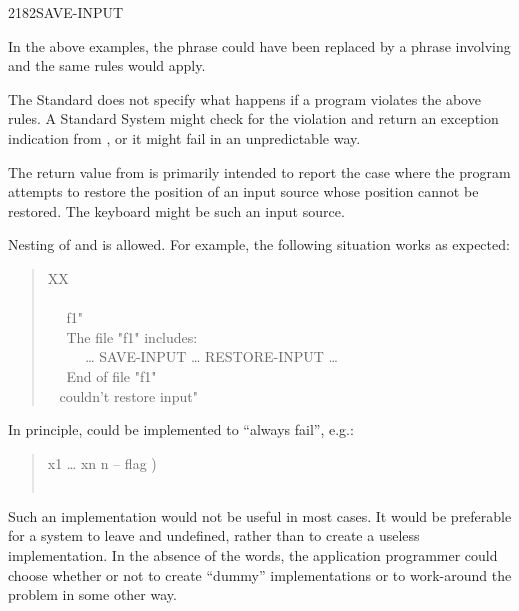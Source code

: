 \begin{newword}{2182}{SAVE-INPUT}
\begin{rationale}
		In the above examples, the  phrase could have
		been replaced by a phrase involving 
		and the same rules would apply.

		The Standard does not specify what happens if a program
		violates the above rules. A Standard System might check for
		the violation and return an exception indication from
		, or it might fail in an unpredictable
		way.

		The return value from  is primarily
		intended to report the case where the program attempts to
		restore the position of an input source whose position cannot
		be restored. The keyboard might be such an input source.

		Nesting of  and  is
		allowed. For example, the following situation works as
		expected:

		\begin{quote}\ttfamily
			\word{:} XX \\
			\tab {} \\
			\tab~~  f1"  \\
			\tab~~  The file "f1" includes: \\
			\tab~~  ~~ {\ldots} SAVE-INPUT {\ldots} RESTORE-INPUT {\ldots} \\
			\tab~~  End of file "f1" \\
			\tab {} ~  couldn't restore input" \\
			\word{;}
		\end{quote}

		In principle,  could be implemented to
		``always fail'', e.g.:

		\begin{quote}\ttfamily
			\word{:}   x1 {\ldots} xn n -- flag ) \\
			     \\
			\word{;}
		\end{quote}

		Such an implementation would not be useful in most cases. It
		would be preferable for a system to leave 
		and  undefined, rather than to create a
		useless implementation. In the absence of the words, the
		application programmer could choose whether or not to create
		``dummy'' implementations or to work-around the problem in
		some other way.


\end{rationale}
\end{newword}
